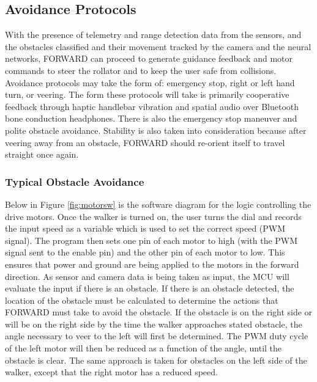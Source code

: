 \subsection{Avoidance Protocols}
\noindent With the presence of telemetry and range detection data from the sensors, and the obstacles classified and their movement tracked by the camera and the neural networks, FORWARD can proceed to generate guidance feedback and motor commands to steer the rollator and to keep the user safe from collisions. Avoidance protocols may take the form of: emergency stop, right or left hand turn, or veering. The form these protocols will take is primarily cooperative feedback through haptic handlebar vibration and spatial audio over Bluetooth bone conduction headphones. There is also the emergency stop maneuver and polite obstacle avoidance. Stability is also taken into consideration because after veering away from an obstacle, FORWARD should re-orient itself to travel straight once again.

\subsubsection{Typical Obstacle Avoidance}

\noindent Below in Figure \ref{fig:motorsw} is the software diagram for the logic controlling the drive motors. Once the walker is turned on, the user turns the dial and records the input speed as a variable which is used to set the correct speed (PWM signal). The program then sets one pin of each motor to high (with the PWM signal sent to the enable pin) and the other pin of each motor to low. This ensures that power and ground are being applied to the motors in the forward direction. As sensor and camera data is being taken as input, the MCU will evaluate the input if there is an obstacle. If there is an obstacle detected, the location of the obstacle must be calculated to determine the actions that FORWARD must take to avoid the obstacle. If the obstacle is on the right side or will be on the right side by the time the walker approaches stated obstacle, the angle necessary to veer to the left will first be determined. The PWM duty cycle of the left motor will then be reduced as a function of the angle, until the obstacle is clear. The same approach is taken for obstacles on the left side of the walker, except that the right motor has a reduced speed.

